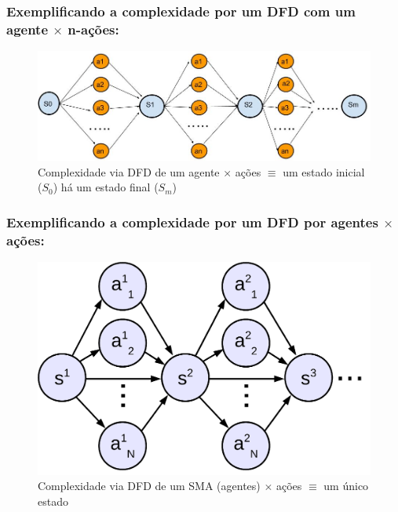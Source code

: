 \begin{frame}
\frametitle{Exemplificando a complexidade por um DFD com  \textbf{um agente} 
$\times$ \textbf{n-ações}:}
  
  \begin{figure}[!ht]
  \centering
  \includegraphics[height =.6\textheight,width=.9\textwidth]{figuras/dfd_simples_acoes.jpg}
  \caption{Complexidade via DFD de um agente $\times $ ações $\equiv $ um estado  inicial ($S_0$) há um estado final ($S_m$)}
\end{figure}
   
\end{frame}


\begin{frame}
\frametitle{Exemplificando a complexidade por um DFD por \textbf{agentes} $\times$ \textbf{ações}:}
  
  \begin{figure}[!ht]
  \centering
  \includegraphics[height =.6\textheight,width=.8\textwidth]{figuras/mudando_estados01.png}
  \caption{Complexidade via DFD de um SMA (agentes) $\times $ ações $\equiv $ um único estado}
\end{figure}
   
\end{frame}


